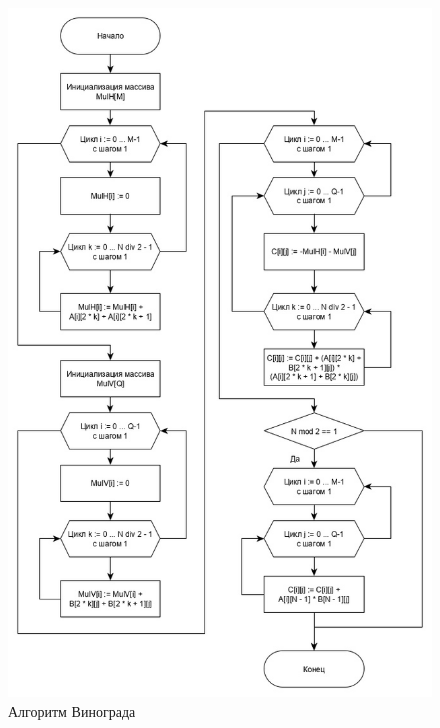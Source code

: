 \documentclass[12pt, a4paper]{report}
\begin{document}
	\begin{figure}[ht!]
		\centering
		\includegraphics[scale=0.6]{vin.jpg}
		\caption{Алгоритм Винограда}
		\label{pic:vin}
	\end{figure}
	\newpage
\end{document}
